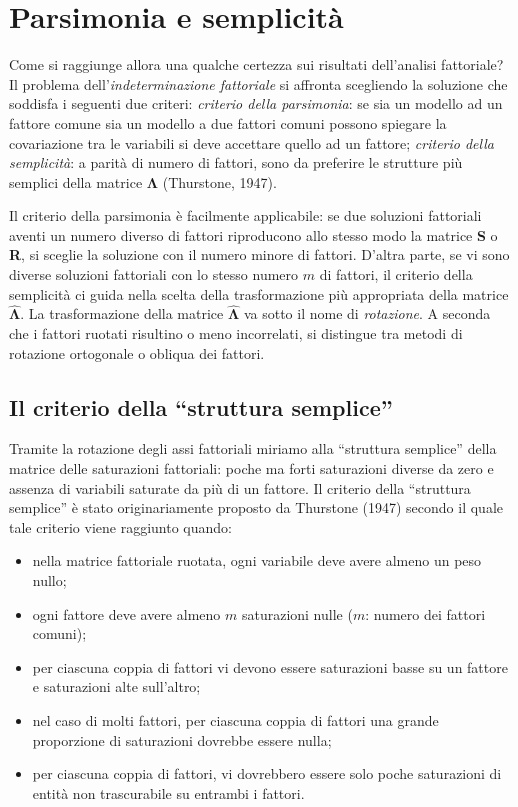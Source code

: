 \documentclass[
  11pt,
]{krantz}
\providecommand{\tightlist}{%
  \setlength{\itemsep}{0pt}\setlength{\parskip}{0pt}}
\theoremstyle{definition}
\theoremstyle{definition}
\theoremstyle{definition}
\theoremstyle{definition}
\theoremstyle{remark}
\begin{document}
\hypertarget{parsimonia-e-semplicituxe0}{%
\section{Parsimonia e semplicità}\label{parsimonia-e-semplicituxe0}}

Come si raggiunge allora una qualche certezza sui risultati dell'analisi fattoriale? Il problema dell'\emph{indeterminazione fattoriale} si affronta scegliendo la soluzione che soddisfa i seguenti due criteri: \emph{criterio della parsimonia}: se sia un modello ad un fattore comune sia un modello a due fattori comuni possono spiegare la covariazione tra le variabili si deve accettare quello ad un fattore; \emph{criterio della semplicità}: a parità di numero di fattori, sono da preferire le strutture più semplici della matrice \(\boldsymbol{\Lambda}\) (Thurstone, 1947).

Il criterio della parsimonia è facilmente applicabile: se due soluzioni fattoriali aventi un numero diverso di fattori riproducono allo stesso modo la matrice \textbf{S} o \textbf{R}, si sceglie la soluzione con il numero minore di fattori. D'altra parte, se vi sono diverse soluzioni fattoriali con lo stesso numero \(m\) di fattori, il criterio della semplicità ci guida nella scelta della trasformazione più appropriata della matrice \(\hat{\boldsymbol{\Lambda}}\). La trasformazione della matrice \(\hat{\boldsymbol{\Lambda}}\) va sotto il nome di \emph{rotazione}. A seconda che i fattori ruotati risultino o meno incorrelati, si distingue tra metodi di rotazione ortogonale o obliqua dei fattori.

\hypertarget{il-criterio-della-struttura-semplice}{%
\subsection{Il criterio della ``struttura semplice''}\label{il-criterio-della-struttura-semplice}}

Tramite la rotazione degli assi fattoriali miriamo alla ``struttura semplice'' della matrice delle saturazioni fattoriali: poche ma forti saturazioni diverse da zero e assenza di variabili saturate da più di un fattore. Il criterio della ``struttura semplice'' è stato originariamente proposto da Thurstone (1947) secondo il quale tale criterio viene raggiunto quando:

\begin{itemize}
\tightlist
\item
  nella matrice fattoriale ruotata, ogni variabile deve avere almeno un peso nullo;
\item
  ogni fattore deve avere almeno \(m\) saturazioni nulle (\(m\): numero dei fattori comuni);
\item
  per ciascuna coppia di fattori vi devono essere saturazioni basse su un fattore e saturazioni alte sull'altro;
\item
  nel caso di molti fattori, per ciascuna coppia di fattori una grande proporzione di saturazioni dovrebbe essere nulla;
\item
  per ciascuna coppia di fattori, vi dovrebbero essere solo poche saturazioni di entità non trascurabile su entrambi i fattori.
\end{itemize}
\end{document}
